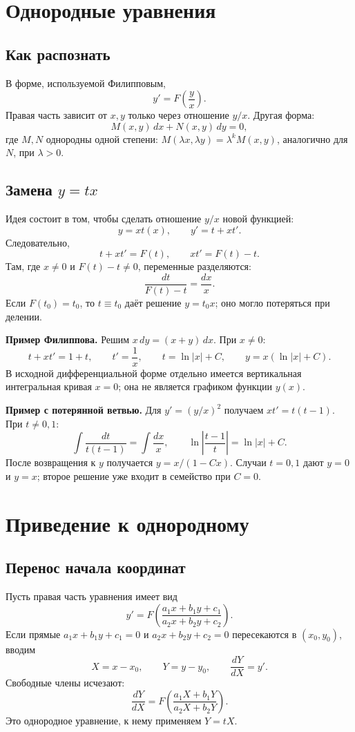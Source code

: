 \documentclass[12pt,a4paper]{article}
\begin{document}
\section{Однородные уравнения}
\subsection{Как распознать}
В форме, используемой Филипповым,
\[
y'=F\!\left(\frac yx\right).
\]
Правая часть зависит от $x,y$ только через отношение $y/x$. Другая форма:
\[
M(x,y)\,dx+N(x,y)\,dy=0,
\]
где $M,N$ однородны одной степени: $M(\lambda x,\lambda y)=\lambda^kM(x,y)$, аналогично для $N$, при $\lambda>0$.

\subsection{Замена $y=tx$}
Идея состоит в том, чтобы сделать отношение $y/x$ новой функцией:
\[
y=xt(x),\qquad y'=t+xt'.
\]
Следовательно,
\[
t+xt'=F(t),\qquad xt'=F(t)-t.
\]
Там, где $x\ne0$ и $F(t)-t\ne0$, переменные разделяются:
\[
\frac{dt}{F(t)-t}=\frac{dx}{x}.
\]
Если $F(t_0)=t_0$, то $t\equiv t_0$ даёт решение $y=t_0x$; оно могло потеряться при делении.

\textbf{Пример Филиппова.} Решим $x\,dy=(x+y)\,dx$. При $x\ne0$:
\[
t+xt'=1+t,\qquad t'=\frac1x,\qquad
t=\ln|x|+C,\qquad y=x(\ln|x|+C).
\]
В исходной дифференциальной форме отдельно имеется вертикальная интегральная кривая $x=0$; она не является графиком функции $y(x)$.

\textbf{Пример с потерянной ветвью.} Для $y'=(y/x)^2$ получаем $xt'=t(t-1)$. При $t\ne0,1$:
\[
\int\frac{dt}{t(t-1)}=\int\frac{dx}{x},
\qquad
\ln\left|\frac{t-1}{t}\right|=\ln|x|+C.
\]
После возвращения к $y$ получается $y=x/(1-Cx)$. Случаи $t=0,1$ дают $y=0$ и $y=x$; второе решение уже входит в семейство при $C=0$.

\section{Приведение к однородному}
\subsection{Перенос начала координат}
Пусть правая часть уравнения имеет вид
\[
y'=F\!\left(
\frac{a_1x+b_1y+c_1}{a_2x+b_2y+c_2}\right).
\]
Если прямые $a_1x+b_1y+c_1=0$ и $a_2x+b_2y+c_2=0$ пересекаются в $(x_0,y_0)$, вводим
\[
X=x-x_0,\qquad Y=y-y_0,\qquad \frac{dY}{dX}=y'.
\]
Свободные члены исчезают:
\[
\frac{dY}{dX}
=F\!\left(\frac{a_1X+b_1Y}{a_2X+b_2Y}\right).
\]
Это однородное уравнение, к нему применяем $Y=tX$.
\end{document}
